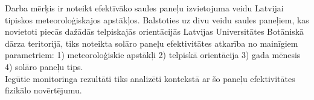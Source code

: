 Darba mērķis ir noteikt efektīvāko saules paneļu izvietojuma veidu Latvijai tipiskos meteoroloģiskajos apstākļos. 
Balstoties uz divu veidu saules paneļiem, kas novietoti piecās dažādās telpiskajās orientācijās Latvijas Universitātes Botāniskā dārza teritorijā, tiks noteikta solāro paneļu efektivitātes atkarība no mainīgiem parametriem:
1) meteoroloģiskie apstākļi
2) telpiskā orientācija
3) gada mēnesis
4) solāro paneļu tips. \\
Iegūtie monitoringa rezultāti tiks analizēti kontekstā ar šo paneļu efektivitātes fizikālo novērtējumu.\\

